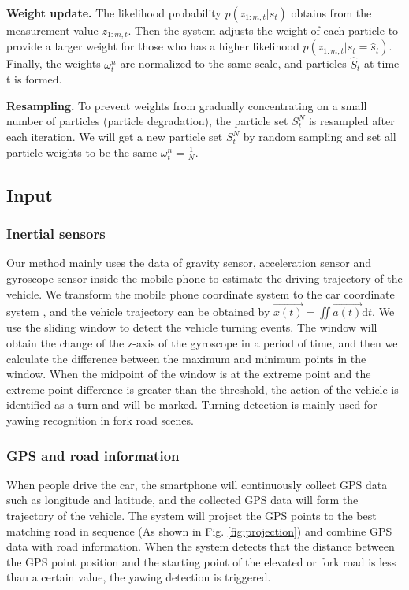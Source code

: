 \documentclass[journal]{IEEEtran}
\begin{document}
\textbf{Weight update.}
The likelihood probability $p(z_{1:m,t}|\hat{s}_t)$ obtains from the measurement value $z_{1:m,t}$. Then the system adjusts the weight of each particle to provide a larger weight for those who has a higher likelihood $p(z_{1:m,t}|s_t = \hat{s}_t)$. Finally, the weights $\omega_{t}^{n}$ are normalized to the same scale, and particles $\hat{S}_t$ at time t is formed.

\textbf{Resampling.}
To prevent weights from gradually concentrating on a small number of particles (particle degradation), the particle set $S_{t}^{N}$ is resampled after each iteration. We will get a new particle set $S_{t}^{N}$ by random sampling and set all particle weights to be the same $\omega_{t}^{n} = \frac{1}{N}$.

\subsection{Input}
\subsubsection{Inertial sensors}
Our method mainly uses the data of gravity sensor, acceleration sensor and gyroscope sensor inside the mobile phone to estimate the driving trajectory of the vehicle. We transform the mobile phone coordinate system to the car coordinate system \cite{xiao2021many, gao2017smartphone}, and the vehicle trajectory can be obtained by $\Vec{x(t)}=\iint\Vec{a(t)}\mathrm{d}t$. We use the sliding window to detect the vehicle turning events. The window will obtain the change of the z-axis of the gyroscope in a period of time, and then we calculate the difference between the maximum and minimum points in the window. When the midpoint of the window is at the extreme point and the extreme point difference is greater than the threshold, the action of the vehicle is identified as a turn and will be marked. Turning detection is mainly used for yawing recognition in fork road scenes.

\subsubsection{GPS and road information}
When people drive the car, the smartphone will continuously collect GPS data such as longitude and latitude, and the collected GPS data will form the trajectory of the vehicle. The system will project the GPS points to the best matching road in sequence (As shown in Fig. \ref{fig:projection}) and combine GPS data with road information. When the system detects that the distance between the GPS point position and the starting point of the elevated or fork road is less than a certain value, the yawing detection is triggered.
\end{document}
